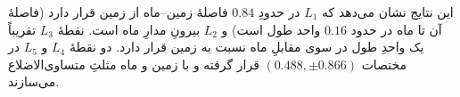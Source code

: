 %
%		
%		
%		
%		
%		
%		
%		

\noindent
این نتایج نشان می‌دهد که $L_{1}$ در حدودِ $0.84$ فاصلهٔ زمین–ماه از زمین قرار دارد (فاصلهٔ آن تا ماه در حدود $0.16$ واحد طول است) و $L_{2}$ بیرونِ مدارِ ماه است. نقطهٔ $L_{3}$ تقریباً یک واحدِ طول در سوی مقابلِ ماه نسبت به زمین قرار دارد. دو نقطهٔ $L_{4}$ و $L_{5}$ در مختصات $(0.488,\pm0.866)$ قرار گرفته و با زمین و ماه مثلثِ متساوی‌الاضلاع می‌سازند.
